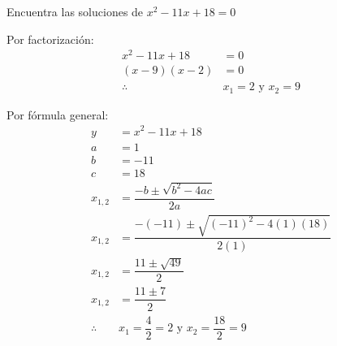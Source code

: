 Encuentra las soluciones de $x^2-11x+18=0$

\begin{solutionbox}{12cm}
    \begin{multicols}{2}
        Por factorización:
        \begin{align*}
            x^2-11x+18 & = 0                      \\
            (x-9)(x-2) & = 0                      \\
            \therefore & x_1 =2 \text{ y } x_2 =9
        \end{align*}

        \columnbreak

        Por fórmula general:
        \begin{align*}
            y          & =	     x^2-11x+18
            \\
            a          & =1
            \\
            b          & =-11
            \\
            c          & =18
            \\
            x_{1,2}    & = \dfrac{-b\pm\sqrt{b^2-4ac}}{2a}
            \\[2em]
            x_{1,2}    & = \dfrac{-(-11)\pm\sqrt{(-11)^2-4(1)(18)}}{2(1)}
            \\[2em]
            x_{1,2}    & = \dfrac{11\pm\sqrt{49}}{2}
            \\[2em]
            x_{1,2}    & = \dfrac{11\pm 7}{2}
            \\[2em]
            \therefore & x_1 =\dfrac{4}{2}=2 \text{ y }  x_2
            =\dfrac{18}{2}=9                                              \\[2em]
        \end{align*}
    \end{multicols}
\end{solutionbox}
